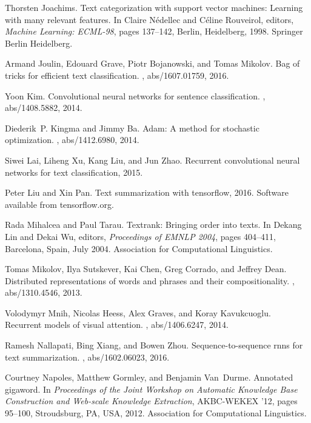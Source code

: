 \documentclass{article}
\begin{document}
\begin{thebibliography}{10}
Thorsten Joachims.
\newblock Text categorization with support vector machines: Learning with many
  relevant features.
\newblock In Claire N{\'e}dellec and C{\'e}line Rouveirol, editors, {\em
  Machine Learning: ECML-98}, pages 137--142, Berlin, Heidelberg, 1998.
  Springer Berlin Heidelberg.

Armand Joulin, Edouard Grave, Piotr Bojanowski, and Tomas Mikolov.
\newblock Bag of tricks for efficient text classification.
, abs/1607.01759, 2016.

Yoon Kim.
\newblock Convolutional neural networks for sentence classification.
, abs/1408.5882, 2014.

Diederik~P. Kingma and Jimmy Ba.
\newblock Adam: {A} method for stochastic optimization.
, abs/1412.6980, 2014.

Siwei Lai, Liheng Xu, Kang Liu, and Jun Zhao.
\newblock Recurrent convolutional neural networks for text classification,
  2015.

Peter Liu and Xin Pan.
\newblock Text summarization with tensorflow, 2016.
\newblock Software available from tensorflow.org.

Rada Mihalcea and Paul Tarau.
\newblock Textrank: Bringing order into texts.
\newblock In Dekang Lin and Dekai Wu, editors, {\em Proceedings of EMNLP 2004},
  pages 404--411, Barcelona, Spain, July 2004. Association for Computational
  Linguistics.

Tomas Mikolov, Ilya Sutskever, Kai Chen, Greg Corrado, and Jeffrey Dean.
\newblock Distributed representations of words and phrases and their
  compositionality.
, abs/1310.4546, 2013.

Volodymyr Mnih, Nicolas Heess, Alex Graves, and Koray Kavukcuoglu.
\newblock Recurrent models of visual attention.
, abs/1406.6247, 2014.

Ramesh Nallapati, Bing Xiang, and Bowen Zhou.
\newblock Sequence-to-sequence rnns for text summarization.
, abs/1602.06023, 2016.

Courtney Napoles, Matthew Gormley, and Benjamin Van~Durme.
\newblock Annotated gigaword.
\newblock In {\em Proceedings of the Joint Workshop on Automatic Knowledge Base
  Construction and Web-scale Knowledge Extraction}, AKBC-WEKEX '12, pages
  95--100, Stroudsburg, PA, USA, 2012. Association for Computational
  Linguistics.


\end{thebibliography}
\end{document}
